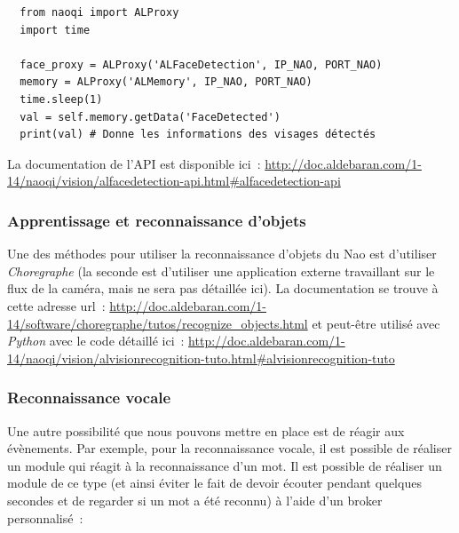 \documentclass{article}
\begin{document}
\begin{verbatim}
  from naoqi import ALProxy
  import time

  face_proxy = ALProxy('ALFaceDetection', IP_NAO, PORT_NAO)
  memory = ALProxy('ALMemory', IP_NAO, PORT_NAO)
  time.sleep(1)
  val = self.memory.getData('FaceDetected')
  print(val) # Donne les informations des visages détectés
\end{verbatim}

La documentation de l'API est disponible ici~:
\url{http://doc.aldebaran.com/1-14/naoqi/vision/alfacedetection-api.html#alfacedetection-api}

\subsubsection{Apprentissage et reconnaissance d'objets}

Une des méthodes pour utiliser la reconnaissance d'objets du Nao est d'utiliser \emph{Choregraphe} (la seconde est d'utiliser une application externe travaillant sur le flux de la caméra, mais ne sera pas détaillée ici).
La documentation se trouve à cette adresse url~: \url{http://doc.aldebaran.com/1-14/software/choregraphe/tutos/recognize_objects.html} et peut-être utilisé avec \emph{Python} avec le code détaillé ici~: \url{http://doc.aldebaran.com/1-14/naoqi/vision/alvisionrecognition-tuto.html#alvisionrecognition-tuto}

\subsubsection{Reconnaissance vocale}
Une autre possibilité que nous pouvons mettre en place est de réagir aux évènements. Par exemple, pour la reconnaissance vocale, il est possible de réaliser un module qui réagit à la reconnaissance d'un mot. Il est possible de réaliser un module de ce type (et ainsi éviter le fait de devoir écouter pendant quelques secondes et de regarder si un mot a été reconnu) à l'aide d'un broker personnalisé~:
\end{document}
